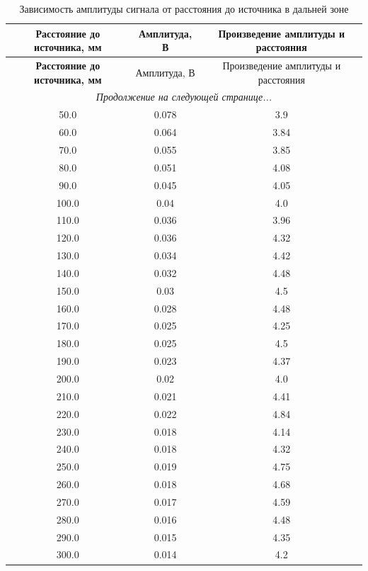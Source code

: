 \documentclass[a4paper,14pt]{article}
\begin{document}
\begin{longtable}{|c|c|c|}

    \caption{Зависимость амплитуды сигнала от расстояния до источника в дальней зоне} \label{tab:tab2} \\
    \hline
    \textbf{Расстояние до источника, мм} & Амплитуда, В & Произведение амплитуды и расстояния \\
    \hline
    \endfirsthead


    \hline
    \textbf{Расстояние до источника, мм} & Амплитуда, В & Произведение амплитуды и расстояния \\
    \hline
    \endhead


    \hline
    \multicolumn{3}{|c|}{\textit{Продолжение на следующей странице...}} \\
    \hline
    \endfoot


    \hline
    \endlastfoot


50.0 & 0.078 & 3.9 \\ \hline
60.0 & 0.064 & 3.84 \\ \hline
70.0 & 0.055 & 3.85 \\ \hline
80.0 & 0.051 & 4.08 \\ \hline
90.0 & 0.045 & 4.05 \\ \hline
100.0 & 0.04 & 4.0 \\ \hline
110.0 & 0.036 & 3.96 \\ \hline
120.0 & 0.036 & 4.32 \\ \hline
130.0 & 0.034 & 4.42 \\ \hline
140.0 & 0.032 & 4.48 \\ \hline
150.0 & 0.03 & 4.5 \\ \hline
160.0 & 0.028 & 4.48 \\ \hline
170.0 & 0.025 & 4.25 \\ \hline
180.0 & 0.025 & 4.5 \\ \hline
190.0 & 0.023 & 4.37 \\ \hline
200.0 & 0.02 & 4.0 \\ \hline
210.0 & 0.021 & 4.41 \\ \hline
220.0 & 0.022 & 4.84 \\ \hline
230.0 & 0.018 & 4.14 \\ \hline
240.0 & 0.018 & 4.32 \\ \hline
250.0 & 0.019 & 4.75 \\ \hline
260.0 & 0.018 & 4.68 \\ \hline
270.0 & 0.017 & 4.59 \\ \hline
280.0 & 0.016 & 4.48 \\ \hline
290.0 & 0.015 & 4.35 \\ \hline
300.0 & 0.014 & 4.2 \\ \hline

\end{longtable}
\end{document}
